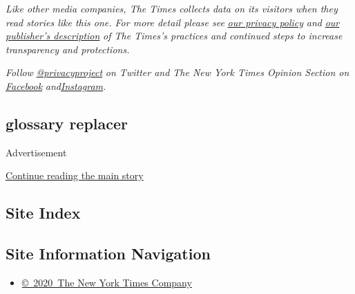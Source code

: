 \emph{Like other media companies, The Times collects data on its
visitors when they read stories like this one. For more detail please
see}
\href{https://help.nytimes.com/hc/en-us/articles/115014892108-Privacy-policy?module=inline}{\emph{our
privacy policy}} \emph{and}
\href{https://www.nytimes.com/2019/04/10/opinion/sulzberger-new-york-times-privacy.html?rref=collection\%2Fspotlightcollection\%2Fprivacy-project-does-privacy-matter\&action=click\&contentCollection=opinion\&region=stream\&module=stream_unit\&version=latest\&contentPlacement=8\&pgtype=collection}{\emph{our
publisher's description}} \emph{of The Times's practices and continued
steps to increase transparency and protections.}

\emph{Follow}
\href{https://twitter.com/privacyproject}{\emph{@privacyproject}}
\emph{on Twitter and The New York Times Opinion Section on}
\href{https://www.facebook.com/nytopinion}{\emph{Facebook}}
\emph{and}\href{https://www.instagram.com/nytopinion/}{\emph{Instagram}}\emph{.}

\hypertarget{glossary-replacer}{%
\subsection{glossary replacer}\label{glossary-replacer}}

Advertisement

\protect\hyperlink{after-bottom}{Continue reading the main story}

\hypertarget{site-index}{%
\subsection{Site Index}\label{site-index}}

\hypertarget{site-information-navigation}{%
\subsection{Site Information
Navigation}\label{site-information-navigation}}

\begin{itemize}
\tightlist
\item
  \href{https://help.nytimes.com/hc/en-us/articles/115014792127-Copyright-notice}{©~2020~The
  New York Times Company}
\end{itemize}

